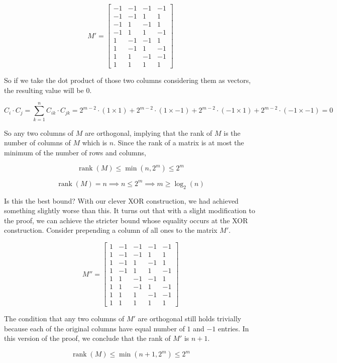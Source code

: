 \[
M'
=
\begin{bmatrix}
-1&-1&-1&-1\\
-1&-1&1&1\\
-1&1&-1&1\\
-1&1&1&-1\\
1&-1&-1&1\\
1&-1&1&-1\\
1&1&-1&-1\\
1&1&1&1
\end{bmatrix}
\]

So if we take the dot product of those two columns considering them as vectors, the resulting value 
will be $0$.

\[
C_i \cdot C_j = \sum_{k=1}^n C_{ik} \cdot C_{jk} = 2^{m-2} \cdot (1 \times 1) + 2^{m-2} \cdot (1 \times -1) + 2^{m-2} \cdot (-1 \times 1) + 2^{m-2} \cdot (-1 \times -1) = 0
\]

So any two columns of $M$ are orthogonal, implying that the rank of $M$ is the number of columns of $M$ which is 
$n$. Since the rank of a matrix is at most the minimum of the number of rows and columns, 

\[
\operatorname{rank}(M) \leq \min(n,2^m) \leq 2^m
\]

\[
\operatorname{rank}(M)=n
\implies n \leq 2^m 
\implies m \geq \log_2(n)
\]

Is this the best bound? With our clever XOR construction, we had achieved something slightly worse than this. 
It turns out that with a slight modification to the proof, we can achieve the stricter bound whose 
equality occurs at the XOR construction. Consider prepending a column of all ones to the matrix $M'$. 

\[
M''
=
\begin{bmatrix}
1&-1&-1&-1&-1\\
1&-1&-1&1&1\\
1&-1&1&-1&1\\
1&-1&1&1&-1\\
1&1&-1&-1&1\\
1&1&-1&1&-1\\
1&1&1&-1&-1\\
1&1&1&1&1
\end{bmatrix}
\]

The condition that any two columns of $M'$ are orthogonal still holds trivially because each of the original 
columns have equal number of $1$ and $-1$ entries. In this version of the proof, 
we conclude that the rank of $M'$ is $n+1$.

\[
\operatorname{rank}(M) \leq \min(n+1,2^m) \leq 2^m
\]

